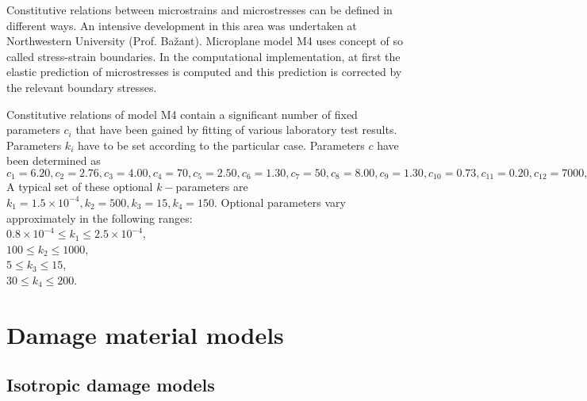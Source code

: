 Constitutive relations between microstrains and microstresses can be defined in different ways.
An intensive development in this area was undertaken at Northwestern University (Prof. Ba\v{z}ant). 
Microplane model M4  uses concept of so called stress-strain boundaries. 
In the computational implementation, at first the elastic prediction of microstresses is computed and this 
prediction is corrected by the relevant boundary stresses.

Constitutive relations  of model M4 contain  a significant number
of  fixed  parameters  $c_i$  that  have  been  gained by fitting of
various  laboratory test  results. Parameters $k_i$ have  to be set
according  to  the  particular   case.  Parameters $c$  have  been
determined as  $c_1 = 6.20, c_2 = 2.76, c_3 = 4.00,  c_4 = 70,
c_5 =2.50, c_6 = 1.30,  c_7 = 50, c_8 = 8.00, c_9 =  1.30, c_{10} = 0.73,
c_{11} = 0.20, c_{12} = 7000, c_{13} = 0.23, c_{14} = 0.80, c_{15} = 1,
c_{16} = 0.02,c_{17} = 0.01, c_{18} =  1, c_{19} = 0.40,  c_{20} =  14.$
A typical set of these optional $k-$parameters are  $k_1 = 1.5 \times 10^{-4}, k_2 =  500, k_3 =  15, k_4 = 150.$
Optional  parameters vary  approximately in  the following ranges:\\
$0.8 \times 10^{-4} \le  k_1 \le 2.5 \times 10^{-4}$,\\
$100 \le k_2 \le 1000$,\\
$5 \le  k_3 \le 15$,\\
$ 30  \le k_4 \le 200$.

\section{Damage material models}
\label{sectdammatmodels}

\subsection{Isotropic damage models}

